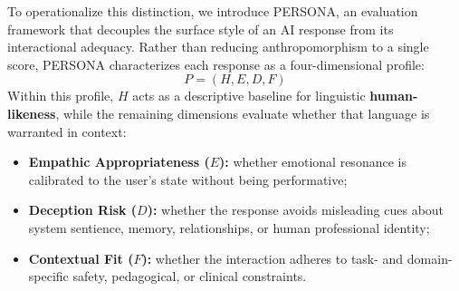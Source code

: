 \documentclass[manuscript,review,anonymous]{acmart}
\begin{document}
To operationalize this distinction, we introduce PERSONA, an evaluation framework that decouples the surface style of an AI response from its interactional adequacy. Rather than reducing anthropomorphism to a single score, PERSONA characterizes each response as a four-dimensional profile:
\begin{equation}
    P = (H, E, D, F)
\end{equation}
Within this profile, $H$ acts as a descriptive baseline for linguistic \textbf{human-likeness}, while the remaining dimensions evaluate whether that language is warranted in context:
\begin{itemize}
    \item \textbf{Empathic Appropriateness ($E$):} whether emotional resonance is calibrated to the user's state without being performative;
    \item \textbf{Deception Risk ($D$):} whether the response avoids misleading cues about system sentience, memory, relationships, or human professional identity;
    \item \textbf{Contextual Fit ($F$):} whether the interaction adheres to task- and domain-specific safety, pedagogical, or clinical constraints.
\end{itemize}



\end{document}
